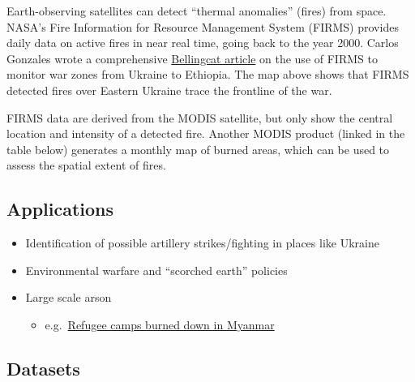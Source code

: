\documentclass[
  letterpaper,
  DIV=11,
  numbers=noendperiod]{scrreprt}
\providecommand{\tightlist}{%
  \setlength{\itemsep}{0pt}\setlength{\parskip}{0pt}}\usepackage{longtable,booktabs,array}
\begin{document}
Earth-observing satellites can detect ``thermal anomalies'' (fires) from
space. NASA's Fire Information for Resource Management System (FIRMS)
provides daily data on active fires in near real time, going back to the
year 2000. Carlos Gonzales wrote a comprehensive
\href{https://www.bellingcat.com/resources/2022/10/04/scorched-earth-using-nasa-fire-data-to-monitor-war-zones/}{Bellingcat
article} on the use of FIRMS to monitor war zones from Ukraine to
Ethiopia. The map above shows that FIRMS detected fires over Eastern
Ukraine trace the frontline of the war.

FIRMS data are derived from the MODIS satellite, but only show the
central location and intensity of a detected fire. Another MODIS product
(linked in the table below) generates a monthly map of burned areas,
which can be used to assess the spatial extent of fires.

\hypertarget{applications-5}{%
\subsection*{Applications}\label{applications-5}}

\begin{itemize}
\tightlist
\item
  Identification of possible artillery strikes/fighting in places like
  Ukraine
\item
  Environmental warfare and ``scorched earth'' policies
\item
  Large scale arson

  \begin{itemize}
  \tightlist
  \item
    e.g.~\href{https://citizenevidence.org/2021/02/26/using-viirs-fire-data-for-human-rights-research/}{Refugee
    camps burned down in Myanmar}
  \end{itemize}
\end{itemize}

\hypertarget{datasets-5}{%
\subsection*{Datasets}\label{datasets-5}}
\end{document}
